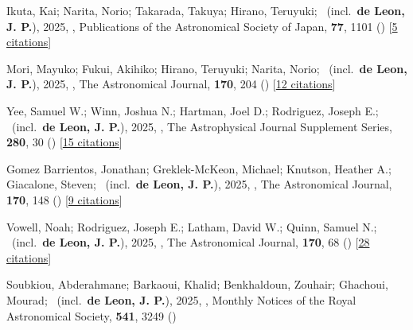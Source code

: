 \item[{\color{numcolor}\scriptsize86}] Ikuta, Kai; Narita, Norio; Takarada, Takuya; Hirano, Teruyuki; \etal\ (incl.\ \textbf{de Leon, J. P.}), 2025, , Publications of the Astronomical Society of Japan, \textbf{77}, 1101 () [\href{https://ui.adsabs.harvard.edu/abs/2025PASJ...77.1101I}{5 citations}]

\item[{\color{numcolor}\scriptsize85}] Mori, Mayuko; Fukui, Akihiko; Hirano, Teruyuki; Narita, Norio; \etal\ (incl.\ \textbf{de Leon, J. P.}), 2025, , The Astronomical Journal, \textbf{170}, 204 () [\href{https://ui.adsabs.harvard.edu/abs/2025AJ....170..204M}{12 citations}]

\item[{\color{numcolor}\scriptsize84}] Yee, Samuel W.; Winn, Joshua N.; Hartman, Joel D.; Rodriguez, Joseph E.; \etal\ (incl.\ \textbf{de Leon, J. P.}), 2025, , The Astrophysical Journal Supplement Series, \textbf{280}, 30 () [\href{https://ui.adsabs.harvard.edu/abs/2025ApJS..280...30Y}{15 citations}]

\item[{\color{numcolor}\scriptsize83}] Gomez Barrientos, Jonathan; Greklek-McKeon, Michael; Knutson, Heather A.; Giacalone, Steven; \etal\ (incl.\ \textbf{de Leon, J. P.}), 2025, , The Astronomical Journal, \textbf{170}, 148 () [\href{https://ui.adsabs.harvard.edu/abs/2025AJ....170..148G}{9 citations}]

\item[{\color{numcolor}\scriptsize82}] Vowell, Noah; Rodriguez, Joseph E.; Latham, David W.; Quinn, Samuel N.; \etal\ (incl.\ \textbf{de Leon, J. P.}), 2025, , The Astronomical Journal, \textbf{170}, 68 () [\href{https://ui.adsabs.harvard.edu/abs/2025AJ....170...68V}{28 citations}]

\item[{\color{numcolor}\scriptsize81}] Soubkiou, Abderahmane; Barkaoui, Khalid; Benkhaldoun, Zouhair; Ghachoui, Mourad; \etal\ (incl.\ \textbf{de Leon, J. P.}), 2025, , Monthly Notices of the Royal Astronomical Society, \textbf{541}, 3249 ()


